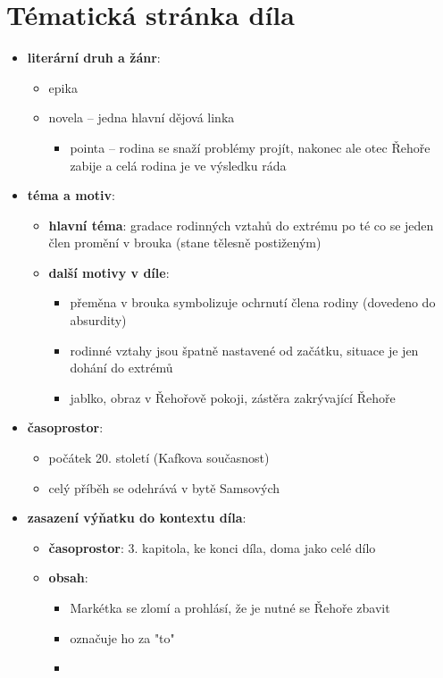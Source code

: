 \documentclass[10pt,a4paper]{article}
\begin{document}
\section*{Tématická stránka díla}
\begin{itemize}
\item \textbf{literární druh a žánr}: 
	\begin{itemize}
	\item epika
	\item novela -- jedna hlavní dějová linka 
		\begin{itemize}
		\item pointa -- rodina se snaží problémy projít, nakonec ale otec Řehoře zabije a celá rodina je ve výsledku ráda
		\end{itemize}
	\end{itemize}
\item \textbf{téma a motiv}:
	\begin{itemize}
	\item \textbf{hlavní téma}: gradace rodinných vztahů do extrému po té co se jeden člen promění v brouka (stane tělesně postiženým)
	\item \textbf{další motivy v díle}:
		\begin{itemize}
		\item přeměna v brouka symbolizuje ochrnutí člena rodiny (dovedeno do absurdity)
		\item rodinné vztahy jsou špatně nastavené od začátku, situace je jen dohání do extrémů
		\item jablko, obraz v Řehořově pokoji, zástěra zakrývající Řehoře
		\end{itemize}
	\end{itemize}
\item \textbf{časoprostor}:
	\begin{itemize}
	\item počátek 20. století (Kafkova současnost)
	\item celý příběh se odehrává v bytě Samsových
	\end{itemize}
\item \textbf{zasazení výňatku do kontextu díla}:
	\begin{itemize}
	\item \textbf{časoprostor}: 3. kapitola, ke konci díla, doma jako celé dílo
	\item \textbf{obsah}: 
		\begin{itemize}
		\item Markétka se zlomí a prohlásí, že je nutné se Řehoře zbavit
		\item označuje ho za "to"
		\item 
		\end{itemize}
	\end{itemize}


\end{itemize}
\end{document}
